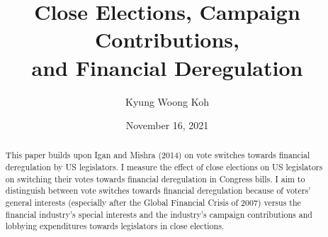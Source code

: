 \documentclass[ProjectKWK]{subfiles}
\begin{document}
\providecommand{\versn}{pdf} %
\ifthenelse{\boolean{Web}}{    %
  \renewcommand{\versn}{Web}     %
  \renewcommand{\rootFromOut}{.} %
}{}  %


\title{Close Elections, Campaign Contributions,\\ and Financial Deregulation}

\author{Kyung Woong Koh\authNum}



\renewcommand{\forcedate}{November 16, 2021}\date{\forcedate}
\maketitle
\hypertarget{abstract}{}
\begin{abstract}
This paper builds upon Igan and Mishra (2014) \cite{IM14} on vote switches towards financial deregulation by US legislators. I measure the effect of close elections on US legislators on switching their votes towards financial deregulation in Congress bills. I aim to distinguish between vote switches towards financial deregulation because of voters' general interests (especially after the Global Financial Crisis of 2007) versus the financial industry's special interests and the industry's campaign contributions and lobbying expenditures towards legislators in close elections.
\end{abstract}


\begin{authorsinfo}
\end{authorsinfo}

\newcommand{\thankstext}{
  The paper is the author's 2nd year paper for fulfillment to the PhD in Economics program at Johns Hopkins University, and also for Professor Christpher Carroll's Computational Methods course. I thank Professors Laurence Ball and Filipe Campante for comments and advice, and Deniz Igan and Prachi Mishra for sharing their data.}
\end{document}
